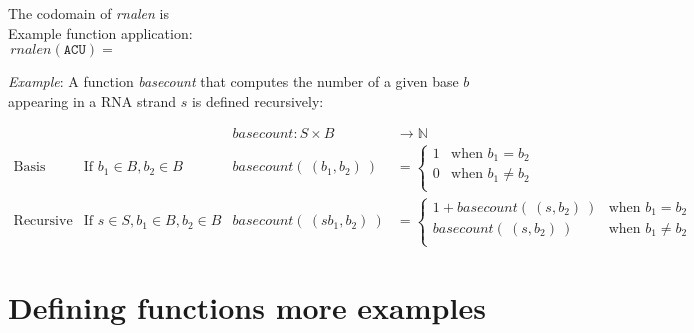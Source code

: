 \documentclass[12pt, oneside]{article}
\newcommand{\A}[0]{\texttt{A}}
\newcommand{\C}[0]{\texttt{C}}
\newcommand{\G}[0]{\texttt{G}}
\newcommand{\U}[0]{\texttt{U}}
\begin{document}
The codomain of \textit{rnalen} is \\

Example function application:
\[
rnalen(\A\C\U) = \phantom{1+ rnalen(\A\C) = 1 + (1 + rnalen(\A) ) = 1 + ( 1 + 1) = 3}
\]

\vfill

{\it Example}: A function \textit{basecount} that computes the number of a given base 
$b$ appearing in a RNA strand $s$ is defined recursively:
    
\[
\begin{array}{llll}
& & \textit{basecount} : S \times B & \to \mathbb{N} \\
\textrm{Basis Step:} &  \textrm{If } b_1 \in B, b_2 \in B & \textit{basecount}(~(b_1, b_2)~) & =
        \begin{cases}
            1 & \textrm{when } b_1 = b_2 \\
            0 & \textrm{when } b_1 \neq b_2 \\
        \end{cases} \\
\textrm{Recursive Step:} & \textrm{If } s \in S, b_1 \in B, b_2 \in B &\textit{basecount}(~(s b_1, b_2)~) & =
        \begin{cases}
            1 + \textit{basecount}(~(s, b_2)~) & \textrm{when } b_1 = b_2 \\
            \textit{basecount}(~(s, b_2)~) & \textrm{when } b_1 \neq b_2 \\
        \end{cases}
\end{array}
\]

 \vfill
\section*{Defining functions more examples}
\end{document}
